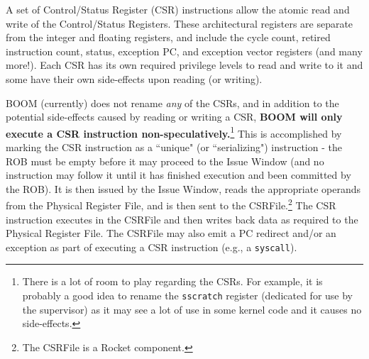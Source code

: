 A set of Control/Status Register (CSR) instructions allow the atomic read and write of the Control/Status Registers.  These architectural registers are separate from the integer and floating registers, and include the cycle count, retired instruction count, status, exception PC, and exception vector registers (and many more!).  Each CSR has its own required privilege levels to read and write to it and some have their own side-effects upon reading (or writing).  

BOOM (currently) does not rename {\em any} of the CSRs, and in addition to the potential side-effects caused by reading or writing a CSR, {\bf BOOM will only execute a CSR instruction non-speculatively.}\footnote{There is a lot of room to play regarding the CSRs. For example, it is probably a good idea to rename the {\tt sscratch} register (dedicated for use by the supervisor) as it may see a lot of use in some kernel code and it causes no side-effects.}  This is accomplished by marking the CSR instruction as a ``unique" (or ``serializing") instruction - the ROB must be empty before it may proceed to the Issue Window (and no instruction may follow it until it has finished execution and been committed by the ROB).  It is then issued by the Issue Window, reads the appropriate operands from the Physical Register File, and is then sent to the CSRFile.\footnote{The CSRFile is a Rocket component.}  The CSR instruction executes in the CSRFile and then writes back data as required to the Physical Register File. The CSRFile may also emit a PC redirect and/or an exception as part of executing a CSR instruction (e.g., a {\tt syscall}). 
